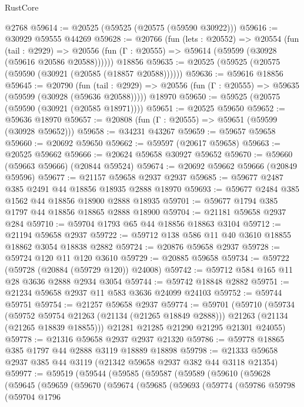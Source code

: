 \begin{lexlean}{RustCore}
\begin{coremodule}
    @2768
@59614 := @20525 (@59525 (@20575 (@59590 @30922)))
@59616 := @30929 @59555 @44269
@59628 := @20766
    (fun (lets : @20552) =>
    @20554
      (fun (tail : @2929) =>
      @20556 (fun (Γ : @20555) => @59614 (@59599 (@30928 (@59616 @20586 @20588))))))
    @18856
@59635 := @20525 (@59525 (@20575 (@59590 (@30921 (@20585 (@18857 @20588))))))
@59636 := @59616 @18856
@59645 := @20790
    (fun (tail : @2929) => @20556 (fun (Γ : @20555) => @59635 (@59599 (@30928 (@59636 @20588)))))
    @18970
@59650 := @59525 (@20575 (@59590 (@30921 (@20585 @18971))))
@59651 := @20525 @59650
@59652 := @59636 @18970
@59657 := @20808 (fun (Γ : @20555) => @59651 (@59599 (@30928 @59652)))
@59658 := @34231 @43267
@59659 := @59657 @59658
@59660 := @20692 @59650
@59662 := @59597 (@20617 @59658)
@59663 := @20525 @59662
@59666 := @20624 @59658 @30927 @59652
@59670 := @59660 (@59663 @59666) (@20844 @59524)
@59674 := @20692 @59662 @59666 (@20849 @59596)
@59677 := @21157 @59658 @2937 @2937
@59685 := @59677 @2487 @385 @2491 @44 @18856 @18935 @2888 @18970
@59693 := @59677 @2484 @385 @1562 @44 @18856 @18900 @2888 @18935
@59701 := @59677 @1794 @385 @1797 @44 @18856 @18865 @2888 @18900
@59704 := @21181 @59658 @2937 @284
@59710 := @59704 @1793 @65 @44 @18856 @18863 @3104
@59712 := @21194 @59658 @2937
@59722 := @59712 @138 @586 @11 @40 @3610 @18855 @18862 @3054 @18838 @2882
@59724 := @20876 @59658 @2937
@59728 := @59724 @120 @11 @120 @3610
@59729 := @20885 @59658
@59734 := @59722 (@59728 (@20884 (@59729 @120)) @24008)
@59742 := @59712 @584 @165 @11 @28 @3636 @2888 @2934 @3054
@59744 := @59742 @18848 @2882
@59751 := @21234 @59658 @2937 @11 @583 @3636 @24099 @24103
@59752 := @59744 @59751
@59754 := @21257 @59658 @2937
@59774 := @59701
    (@59710
      (@59734
        (@59752 @59754 @21263 (@21134 (@21265 @18849 @2888)))
        @21263
        (@21134 (@21265 @18839 @18855)))
      @21281
      @21285
      @21290
      @21295
      @21301
      @24055)
@59778 := @21316 @59658 @2937 @2937 @21320
@59786 := @59778 @18865 @385 @1797 @44 @2888 @3119 @18889 @18898
@59798 := @21333 @59658 @2937 @385 @44 @3119 (@21342 @59658 @2937 @382 @44 @3118 @21354)
@59977 := @59519
    (@59544
      (@59585
        (@59587
          (@59589
            (@59610
              (@59628
                (@59645
                  (@59659
                    (@59670
                      (@59674
                        (@59685
                          (@59693
                            (@59774
                              (@59786
                                @59798
                                (@59704
                                  @1796

\end{coremodule}
\end{lexlean}
